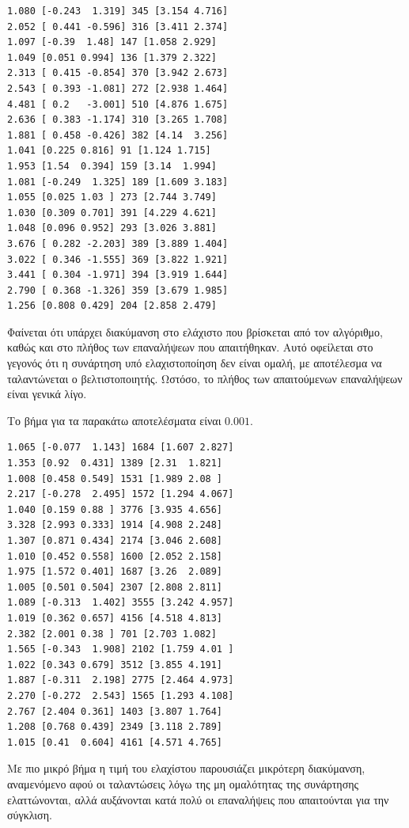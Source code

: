 \documentclass{article}
\begin{document}
\begin{verbatim}
1.080 [-0.243  1.319] 345 [3.154 4.716]
2.052 [ 0.441 -0.596] 316 [3.411 2.374]
1.097 [-0.39  1.48] 147 [1.058 2.929]
1.049 [0.051 0.994] 136 [1.379 2.322]
2.313 [ 0.415 -0.854] 370 [3.942 2.673]
2.543 [ 0.393 -1.081] 272 [2.938 1.464]
4.481 [ 0.2   -3.001] 510 [4.876 1.675]
2.636 [ 0.383 -1.174] 310 [3.265 1.708]
1.881 [ 0.458 -0.426] 382 [4.14  3.256]
1.041 [0.225 0.816] 91 [1.124 1.715]
1.953 [1.54  0.394] 159 [3.14  1.994]
1.081 [-0.249  1.325] 189 [1.609 3.183]
1.055 [0.025 1.03 ] 273 [2.744 3.749]
1.030 [0.309 0.701] 391 [4.229 4.621]
1.048 [0.096 0.952] 293 [3.026 3.881]
3.676 [ 0.282 -2.203] 389 [3.889 1.404]
3.022 [ 0.346 -1.555] 369 [3.822 1.921]
3.441 [ 0.304 -1.971] 394 [3.919 1.644]
2.790 [ 0.368 -1.326] 359 [3.679 1.985]
1.256 [0.808 0.429] 204 [2.858 2.479]
\end{verbatim}

Φαίνεται ότι υπάρχει διακύμανση στο ελάχιστο που βρίσκεται από τον αλγόριθμο, καθώς και στο πλήθος
των επαναλήψεων που απαιτήθηκαν. Αυτό οφείλεται στο γεγονός ότι η συνάρτηση υπό ελαχιστοποίηση δεν είναι
ομαλή, με αποτέλεσμα να ταλαντώνεται ο βελτιστοποιητής. Ωστόσο, το πλήθος των απαιτούμενων επαναλήψεων
είναι γενικά λίγο.

Το βήμα για τα παρακάτω αποτελέσματα είναι $0.001$.

\begin{verbatim}
1.065 [-0.077  1.143] 1684 [1.607 2.827]
1.353 [0.92  0.431] 1389 [2.31  1.821]
1.008 [0.458 0.549] 1531 [1.989 2.08 ]
2.217 [-0.278  2.495] 1572 [1.294 4.067]
1.040 [0.159 0.88 ] 3776 [3.935 4.656]
3.328 [2.993 0.333] 1914 [4.908 2.248]
1.307 [0.871 0.434] 2174 [3.046 2.608]
1.010 [0.452 0.558] 1600 [2.052 2.158]
1.975 [1.572 0.401] 1687 [3.26  2.089]
1.005 [0.501 0.504] 2307 [2.808 2.811]
1.089 [-0.313  1.402] 3555 [3.242 4.957]
1.019 [0.362 0.657] 4156 [4.518 4.813]
2.382 [2.001 0.38 ] 701 [2.703 1.082]
1.565 [-0.343  1.908] 2102 [1.759 4.01 ]
1.022 [0.343 0.679] 3512 [3.855 4.191]
1.887 [-0.311  2.198] 2775 [2.464 4.973]
2.270 [-0.272  2.543] 1565 [1.293 4.108]
2.767 [2.404 0.361] 1403 [3.807 1.764]
1.208 [0.768 0.439] 2349 [3.118 2.789]
1.015 [0.41  0.604] 4161 [4.571 4.765]
\end{verbatim}

Με πιο μικρό βήμα η τιμή του ελαχίστου παρουσιάζει μικρότερη διακύμανση, αναμενόμενο αφού
οι ταλαντώσεις λόγω της μη ομαλότητας της συνάρτησης ελαττώνονται, αλλά αυξάνονται κατά πολύ
οι επαναλήψεις που απαιτούνται για την σύγκλιση.
\end{document}
